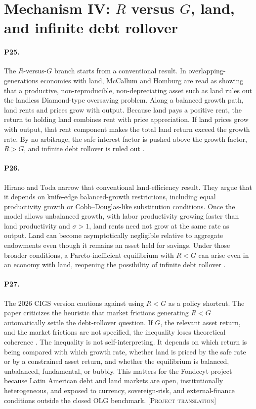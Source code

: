 \documentclass[11pt]{article}
\newcommand{\projecttranslation}{\textsc{[Project translation]}}
\begin{document}
\section{Mechanism IV: \texorpdfstring{\(R\)}{R} versus \texorpdfstring{\(G\)}{G}, land, and infinite debt rollover}

\paragraph{P25.} The \(R\)-versus-\(G\) branch starts from a conventional result. In overlapping-generations economies with land, McCallum and Homburg are read as showing that a productive, non-reproducible, non-depreciating asset such as land rules out the landless Diamond-type oversaving problem. Along a balanced growth path, land rents and prices grow with output. Because land pays a positive rent, the return to holding land combines rent with price appreciation. If land prices grow with output, that rent component makes the total land return exceed the growth rate. By no arbitrage, the safe interest factor is pushed above the growth factor, \(R>G\), and infinite debt rollover is ruled out \citep[pp.~1--2, 16--17]{hiranoToda2025LandInfiniteDebtRollover}.

\paragraph{P26.} Hirano and Toda narrow that conventional land-efficiency result. They argue that it depends on knife-edge balanced-growth restrictions, including equal productivity growth or Cobb--Douglas-like substitution conditions. Once the model allows unbalanced growth, with labor productivity growing faster than land productivity and \(\sigma>1\), land rents need not grow at the same rate as output. Land can become asymptotically negligible relative to aggregate endowments even though it remains an asset held for savings. Under those broader conditions, a Pareto-inefficient equilibrium with \(R<G\) can arise even in an economy with land, reopening the possibility of infinite debt rollover \citep[pp.~1--2, 16--17]{hiranoToda2025LandInfiniteDebtRollover}.

\paragraph{P27.} The 2026 CIGS version cautions against using \(R<G\) as a policy shortcut. The paper criticizes the heuristic that market frictions generating \(R<G\) automatically settle the debt-rollover question. If \(G\), the relevant asset return, and the market frictions are not specified, the inequality loses theoretical coherence \citep[p.~4]{hiranoToda2026LandGversusR}. The inequality is not self-interpreting. It depends on which return is being compared with which growth rate, whether land is priced by the safe rate or by a constrained asset return, and whether the equilibrium is balanced, unbalanced, fundamental, or bubbly. This matters for the Fondecyt project because Latin American debt and land markets are open, institutionally heterogeneous, and exposed to currency, sovereign-risk, and external-finance conditions outside the closed OLG benchmark. \projecttranslation{}
\end{document}
